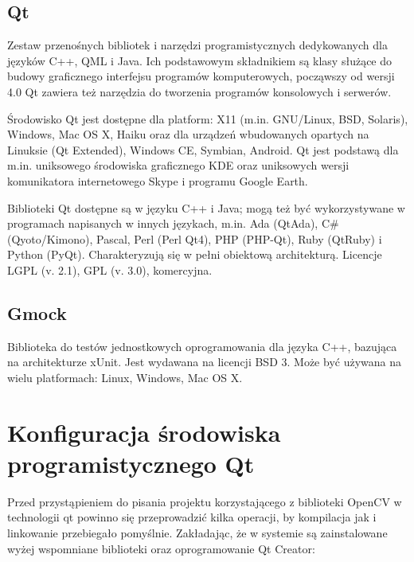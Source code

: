 \documentclass[eng,printmode]{mgr}
\begin{document}
\subsection{Qt}

Zestaw przenośnych bibliotek i narzędzi programistycznych dedykowanych dla języków C++, QML i Java. Ich podstawowym składnikiem są klasy służące do budowy graficznego interfejsu programów komputerowych, począwszy od wersji 4.0 Qt zawiera też narzędzia do tworzenia programów konsolowych i serwerów.

Środowisko Qt jest dostępne dla platform: X11 (m.in. GNU/Linux, BSD, Solaris), Windows, Mac OS X, Haiku oraz dla urządzeń wbudowanych opartych na Linuksie (Qt Extended), Windows CE, Symbian, Android. Qt jest podstawą dla m.in. uniksowego środowiska graficznego KDE oraz uniksowych wersji komunikatora internetowego Skype i programu Google Earth.

Biblioteki Qt dostępne są w języku C++ i Java; mogą też być wykorzystywane w programach napisanych w innych językach, m.in. Ada (QtAda), C\# (Qyoto/Kimono), Pascal, Perl (Perl Qt4), PHP (PHP-Qt), Ruby (QtRuby) i Python (PyQt). Charakteryzują się w pełni obiektową architekturą.
Licencje LGPL (v. 2.1), GPL (v. 3.0), komercyjna\cite{wikiqt}.
\subsection{Gmock}

Biblioteka do testów jednostkowych oprogramowania dla języka C++, bazująca na architekturze xUnit. Jest wydawana na licencji BSD 3. Może być używana na wielu platformach: Linux, Windows, Mac OS X.

\section{Konfiguracja środowiska programistycznego Qt}

Przed przystąpieniem do pisania projektu korzystającego z biblioteki OpenCV w technologii qt powinno się przeprowadzić kilka operacji, by kompilacja jak i linkowanie przebiegało pomyślnie. Zakładając, że w systemie są zainstalowane wyżej wspomniane biblioteki oraz oprogramowanie Qt Creator:
\end{document}
